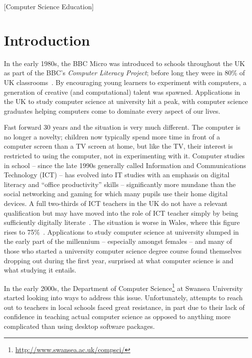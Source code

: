 \documentclass{sig-alternate}
\begin{document}
[Computer Science Education]


\section{Introduction}\label{intro}
In the early 1980s, the BBC Micro was introduced to schools throughout
the UK as part of the BBC's \emph{Computer Literacy Project}; before
long they were in 80\% of UK classrooms~\cite{vasko:1986}. By
encouraging young learners to experiment with computers, a generation
of creative (and computational) talent was spawned. Applications in
the UK to study computer science at university hit a peak, with
computer science graduates helping computers come to dominate every
aspect of our lives.

Fast forward 30 years and the situation is very much different. The
computer is no longer a novelty; children now typically spend more
time in front of a computer screen than a TV screen at home, but like
the TV, their interest is restricted to using the computer, not in
experimenting with it. Computer studies in school -- since the late
1990s generally called Information and Communications Technology (ICT)
-- has evolved into IT studies with an emphasis on digital literacy
and ``office productivity'' skills -- significantly more mundane than
the social networking and gaming for which many pupils use their home
digital devices. A full two-thirds of ICT teachers in the UK do not
have a relevant qualification but may have moved into the role of ICT
teacher simply by being sufficiently digitally
literate~\cite{RoyalSoc:2012}.  The situation is worse in Wales, where
this figure rises to 75\%~\cite{GTCW:2008}. Applications to study
computer science at university slumped in the early part of the
millennium -- especially amongst females -- and many of those who
started a university computer science degree course found themselves
dropping out during the first year, surprised at what computer science
is and what studying it entails.

In the early 2000s, the Department of Computer
Science\footnote{\url{http://www.swansea.ac.uk/compsci/}} at Swansea
University started looking into ways to address this issue.
Unfortunately, attempts to reach out to teachers in local schools
faced great resistance, in part due to their lack of confidence in
teaching actual computer science as opposed to anything more
complicated than using desktop software packages.
\end{document}
